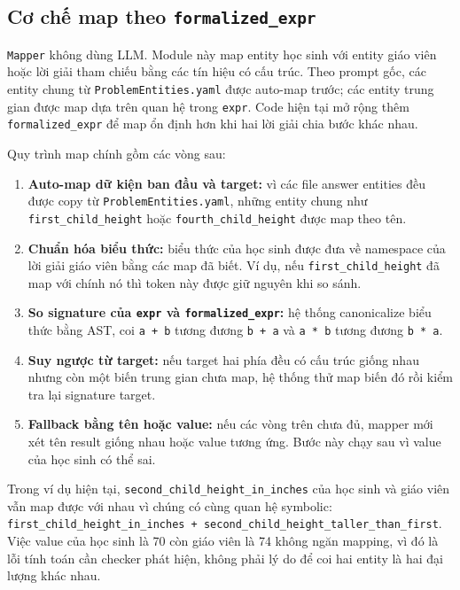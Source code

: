 \documentclass[12pt,a4paper]{article}
\begin{document}
\subsection{Cơ chế map theo \texttt{formalized\_expr}}

\texttt{Mapper} không dùng LLM. Module này map entity học sinh với entity giáo
viên hoặc lời giải tham chiếu bằng các tín hiệu có cấu trúc. Theo prompt gốc,
các entity chung từ \texttt{ProblemEntities.yaml} được auto-map trước; các entity
trung gian được map dựa trên quan hệ trong \texttt{expr}. Code hiện tại mở rộng
thêm \texttt{formalized\_expr} để map ổn định hơn khi hai lời giải chia bước
khác nhau.

Quy trình map chính gồm các vòng sau:

\begin{enumerate}[leftmargin=*]
    \item \textbf{Auto-map dữ kiện ban đầu và target:} vì các file answer
    entities đều được copy từ \texttt{ProblemEntities.yaml}, những entity chung
    như \texttt{first\_child\_height} hoặc \texttt{fourth\_child\_height} được
    map theo tên.
    \item \textbf{Chuẩn hóa biểu thức:} biểu thức của học sinh được đưa về
    namespace của lời giải giáo viên bằng các map đã biết. Ví dụ, nếu
    \texttt{first\_child\_height} đã map với chính nó thì token này được giữ
    nguyên khi so sánh.
    \item \textbf{So signature của \texttt{expr} và
    \texttt{formalized\_expr}:} hệ thống canonicalize biểu thức bằng AST, coi
    \texttt{a + b} tương đương \texttt{b + a} và \texttt{a * b} tương đương
    \texttt{b * a}.
    \item \textbf{Suy ngược từ target:} nếu target hai phía đều có cấu trúc
    giống nhau nhưng còn một biến trung gian chưa map, hệ thống thử map biến đó
    rồi kiểm tra lại signature target.
    \item \textbf{Fallback bằng tên hoặc value:} nếu các vòng trên chưa đủ,
    mapper mới xét tên result giống nhau hoặc value tương ứng. Bước này chạy sau
    vì value của học sinh có thể sai.
\end{enumerate}

Trong ví dụ hiện tại, \texttt{second\_child\_height\_in\_inches} của học sinh
và giáo viên vẫn map được với nhau vì chúng có cùng quan hệ symbolic:
\texttt{first\_child\_height\_in\_inches +
second\_child\_height\_taller\_than\_first}. Việc value của học sinh là 70 còn
giáo viên là 74 không ngăn mapping, vì đó là lỗi tính toán cần checker phát hiện,
không phải lý do để coi hai entity là hai đại lượng khác nhau.
\end{document}
